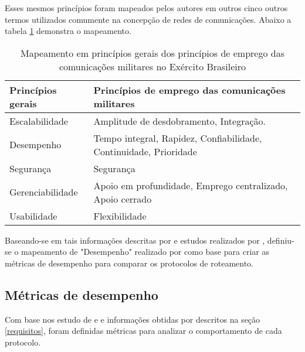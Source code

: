 Esses mesmos princ\'ipios foram mapeados pelos autores \cite{salles} em outros cinco outros termos utilizados comumente na concep\c{c}\~ao de redes de comunica\c{c}\~oes. Abaixo a tabela \ref{tabExer} demonstra o mapeamento.
\begin{table}[H]
	\centering
	\caption{Mapeamento em princ\'ipios gerais dos princ\'ipios de emprego das comunica\c{c}\~oes militares no Ex\'ercito Brasileiro \cite{salles}}
	\begin{tabular}{ | l | l | }
		\hline
		\textbf{Princ\'ipios gerais} & \textbf{Princ\'ipios de emprego das comunica\c{c}\~oes militares} \\ \hline
		Escalabilidade & Amplitude de desdobramento, Integra\c{c}\~ao. \\ \hline
		Desempenho & Tempo integral, Rapidez, Confiabilidade, Continuidade, Prioridade \\ \hline
		Seguran\c{c}a & Seguran\c{c}a \\ \hline
		Gerenciabilidade & Apoio em profundidade, Emprego centralizado, Apoio cerrado \\ \hline
		Usabilidade & Flexibilidade \\ \hline
	\end{tabular}
	\label{tabExer}
\end{table}

Baseando-se em tais informa\c{c}\~oes descritas por \cite{salles} e estudos realizados por \cite{pereira}, definiu-se o mapeamento de "Desempenho" realizado por \cite{salles} como base para criar as m\'etricas de desempenho para comparar os protocolos de roteamento.

\subsection{M\'etricas de desempenho}
Com base nos estudo de \cite{pereira} e \cite{schimidt} e informa\c{c}\~oes obtidas por \cite{salles} descritos na se\c{c}\~ao \ref{requisitos}, foram definidas m\'etricas para analizar o comportamento de cada protocolo.

